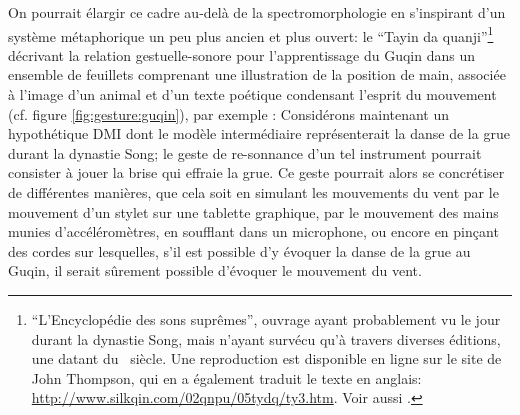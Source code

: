 \indent On pourrait élargir ce cadre au-delà de la spectromorphologie en s'inspirant d'un système métaphorique un peu plus ancien et plus ouvert: le ``Tayin da quanji''\footnote{\label{fn:guqin}``L’Encyclopédie des sons suprêmes'', ouvrage ayant probablement vu le jour durant la dynastie Song, mais n'ayant survécu qu'à travers diverses éditions, une datant du ~siècle. Une reproduction est disponible en ligne sur le site de John Thompson, qui en a également traduit le texte en anglais: \url{http://www.silkqin.com/02qnpu/05tydq/ty3.htm}. Voir aussi \cite{picard_chine:_1991}.} décrivant la relation gestuelle-sonore pour l'apprentissage du Guqin dans un ensemble de feuillets comprenant une illustration de la position de main, associée à l'image d'un animal et d'un texte poétique condensant l'esprit du mouvement (cf. figure \ref{fig:gesture:guqin}), par exemple :  Considérons maintenant un hypothétique \gls{DMI} dont le modèle intermédiaire représenterait la danse de la grue durant la dynastie Song; le geste de re-sonnance d'un tel instrument pourrait consister à jouer la brise qui effraie la grue. Ce geste pourrait alors se concrétiser de différentes manières, que cela soit en simulant les mouvements du vent par le mouvement d'un stylet sur une tablette graphique, par le mouvement des mains munies d'accéléromètres, en soufflant dans un microphone, ou encore en pinçant des cordes sur lesquelles, s'il est possible d'y évoquer la danse de la grue au Guqin, il serait sûrement possible d'évoquer le mouvement du vent.

